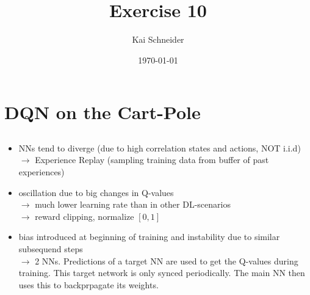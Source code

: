 \documentclass[11pt,a4paper]{article}
\title{Exercise 10}
\author{Kai Schneider}
\date{\today}
\begin{document}
 

\maketitle

\section{DQN on the Cart-Pole}

\subsection{}

\begin{itemize}
  \item NNs tend to diverge (due to high correlation states and actions, NOT i.i.d) \\ $\rightarrow$
        Experience Replay (sampling training data from buffer of past experiences)
  \item oscillation due to big changes in Q-values \\ $\rightarrow$
        much lower learning rate than in other DL-scenarios \\
        $\rightarrow$ reward clipping, normalize $[0,1]$
  \item bias introduced at beginning of training and instability due to similar subsequend steps \\ $\rightarrow$ 
        2 NNs. Predictions of a target NN are used to get the Q-values during training.
        This target network is only synced periodically. The main NN then uses this to backprpagate its weights.
\end{itemize}
\end{document}
